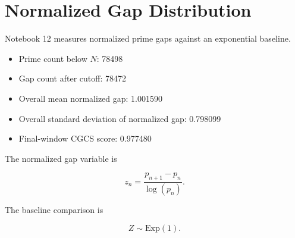 \section*{Normalized Gap Distribution}

Notebook 12 measures normalized prime gaps against an exponential baseline.

\begin{itemize}
  \item Prime count below $N$: 78498
  \item Gap count after cutoff: 78472
  \item Overall mean normalized gap: 1.001590
  \item Overall standard deviation of normalized gap: 0.798099
  \item Final-window CGCS score: 0.977480
\end{itemize}

The normalized gap variable is

\[
z_n = \frac{p_{n+1} - p_n}{\log(p_n)}.
\]

The baseline comparison is

\[
Z \sim \mathrm{Exp}(1).
\]

